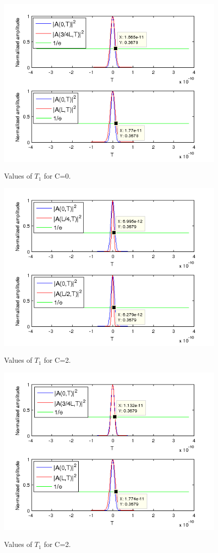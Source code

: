 \documentclass[a4paper,10pt]{report}
\begin{document}
\begin{figure}[!ht]
  \centering
  \includegraphics[width=11cm]{es2_c01.png}\\
  \caption{Values of $T_1$ for C=0.}
  \label{es2_C01}
\end{figure}

\begin{figure}[!ht]
  \centering
  \includegraphics[width=11cm]{es2_c21.png}\\
  \caption{Values of $T_1$ for C=2.}
  \label{es2_C21}
\end{figure}

\begin{figure}[!ht]
  \centering
  \includegraphics[width=11cm]{es2_c22.png}\\
  \caption{Values of $T_1$ for C=2.}
  \label{es2_C22}
\end{figure}
\end{document}
